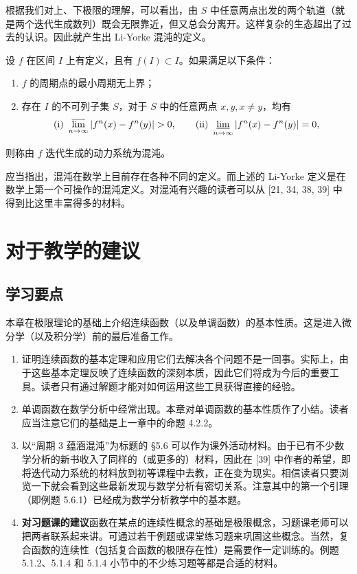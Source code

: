 根据我们对上、下极限的理解，可以看出，由 $S$ 中任意两点出发的两个轨道（就是两个迭代生成数列）既会无限靠近，但又总会分离开。这样复杂的生态超出了过去的认识。因此就产生出 Li-Yorke 混沌的定义。

\begin{xdefinition}
设 $f$ 在区间 $I$ 上有定义，且有 $f(I)\subset I$。如果满足以下条件：
\begin{enumerate}
  \item $f$ 的周期点的最小周期无上界；
  \item 存在 $I$ 的不可列子集 $S$，对于 $S$ 中的任意两点 $x,y,x\ne y$，均有
  \[
    \text{(i) }\varlimsup_{n\to\infty}|f^n(x)-f^n(y)|>0,
    \qquad
    \text{(ii) }\varliminf_{n\to\infty}|f^n(x)-f^n(y)|=0,
  \]
\end{enumerate}
则称由 $f$ 迭代生成的动力系统为混沌。
\end{xdefinition}

应当指出，混沌在数学上目前存在各种不同的定义。而上述的 Li-Yorke 定义是在数学上第一个可操作的混沌定义。对混沌有兴趣的读者可以从 [21, 34, 38, 39] 中得到比这里丰富得多的材料。

\section{对于教学的建议}

\subsection{学习要点}

本章在极限理论的基础上介绍连续函数（以及单调函数）的基本性质。这是进入微分学（以及积分学）前的最后准备工作。

\begin{enumerate}
  \item 证明连续函数的基本定理和应用它们去解决各个问题不是一回事。实际上，由于这些基本定理反映了连续函数的深刻本质，因此它们将成为今后的重要工具。读者只有通过解题才能对如何运用这些工具获得直接的经验。
  \item 单调函数在数学分析中经常出现。本章对单调函数的基本性质作了小结。读者应当注意它们的基础是上一章中的命题 4.2.2。
  \item 以“周期 3 蕴涵混沌”为标题的 §5.6 可以作为课外活动材料。由于已有不少数学分析的新书收入了同样的（或更多的）材料，因此在 [39] 中作者的希望，即将迭代动力系统的材料放到初等课程中去教，正在变为现实。相信读者只要浏览一下就会看到这些最新发现与数学分析有密切关系。注意其中的第一个引理（即例题 5.6.1）已经成为数学分析教学中的基本题。
  \item \textbf{对习题课的建议}\quad 函数在某点的连续性概念的基础是极限概念，习题课老师可以把两者联系起来讲。可通过若干例题或课堂练习题来巩固这些概念。当然，复合函数的连续性（包括复合函数的极限存在性）是需要作一定训练的。例题 5.1.2、5.1.4 和 5.1.4 小节中的不少练习题等都是合适的材料。
\end{enumerate}

